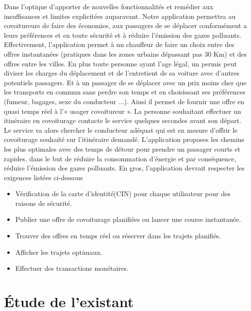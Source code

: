Dans l'optique d'apporter de nouvelles fonctionnalités et remédier aux insuffisances et limites explicitées auparavant. Notre application permettra au covoitureurs de faire des économies, aux passagers de se déplacer conformément a leurs préférences et en toute sécurité et à réduire l’émission des gazes polluants.\newline
Effectivement, l'application permet à un chauffeur de faire un choix entre des offres instantanées (pratiques dans les zones urbains dépassant pas 30 Km) et des offres entre les villes. En plus toute personne ayant l'age légal, un permis peut diviser les charges du déplacement et de l'entretient de sa voiture avec d'autres potentiels passagers. Et à un passager de se déplacer avec un prix moins cher que les transports en commun sans perdre son temps et en choisissant ses préférences (fumeur, bagages, sexe du conducteur ...). Ainsi il permet de fournir une offre en quasi temps réel à l'« usager covoitureur ». La personne souhaitant effectuer un itinéraire en covoiturage contacte le service quelques secondes avant son départ. Le service va alors chercher le conducteur adéquat qui est en mesure d'offrir le covoiturage souhaité sur l'itinéraire demandé.\newline
L'application proposes les chemins les plus optimales avec des temps de détour pour prendre un passager courts et rapides. dans le but de réduire la consommation d’énergie et par conséquence, réduire l’émission des gazes polluants.
En gros, l'application devrait respecter les exigences listées ci-dessous
\begin{itemize}
	\item Vérification de la carte d'identité(CIN) pour chaque utilisateur pour des raisons de sécurité.
	\item Publier une offre de covoiturage planifiées ou lancer une course instantanée.
	\item Trouver des offres en temps réel ou réserver dans les trajets planifiés.
	\item Afficher les trajets optimaux.
	\item Effectuer des transactions monétaires.
\end{itemize}

\section{Étude de l'existant}

